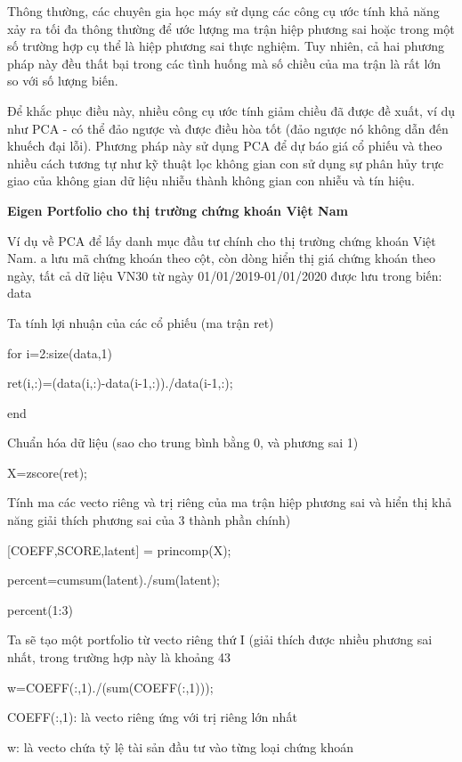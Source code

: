Thông thường, các chuyên gia học máy sử dụng các công cụ ước tính khả năng xảy ra tối đa thông thường để ước lượng ma trận hiệp phương sai hoặc trong một số trường hợp cụ thể là hiệp phương sai thực nghiệm. Tuy nhiên, cả hai phương pháp này đều thất bại trong các tình huống mà số chiều của ma trận là rất lớn so với số lượng biến.

Để khắc phục điều này, nhiều công cụ ước tính giảm chiều đã được đề xuất, ví dụ như PCA - có thể đảo ngược và được điều hòa tốt (đảo ngược nó không dẫn đến khuếch đại lỗi). Phương pháp này sử dụng PCA để dự báo giá cổ phiếu và theo nhiều cách tương tự như kỹ thuật lọc không gian con sử dụng sự phân hủy trực giao của không gian dữ liệu nhiễu thành không gian con nhiễu và tín hiệu.

\textbf{Eigen Portfolio cho thị trường chứng khoán Việt Nam}

Ví dụ về PCA để lấy danh mục đầu tư chính cho thị trường chứng khoán Việt Nam. 
a lưu mã chứng khoán theo cột, còn dòng hiển thị giá chứng khoán theo ngày, tất cả dữ liệu VN30 từ ngày 01/01/2019-01/01/2020 được lưu trong biến: data

Ta tính lợi nhuận của các cổ phiếu (ma trận ret)

for i=2:size(data,1)


ret(i,:)=(data(i,:)-data(i-1,:))./data(i-1,:);

end

Chuẩn hóa dữ liệu (sao cho trung bình bằng 0, và phương sai 1)

X=zscore(ret);

Tính ma các vecto riêng và trị riêng của ma trận hiệp phương sai và hiển thị khả năng giải thích phương sai của 3 thành phần chính)

[COEFF,SCORE,latent] = princomp(X);

percent=cumsum(latent)./sum(latent);

percent(1:3)

Ta sẽ tạo một portfolio từ vecto riêng thứ I (giải thích được nhiều phương sai nhất, trong trường hợp này là khoảng 43%

w=COEFF(:,1)./(sum(COEFF(:,1)));

COEFF(:,1): là vecto riêng ứng với trị riêng lớn nhất

w: là vecto chứa tỷ lệ tài sản đầu tư vào từng loại chứng khoán

